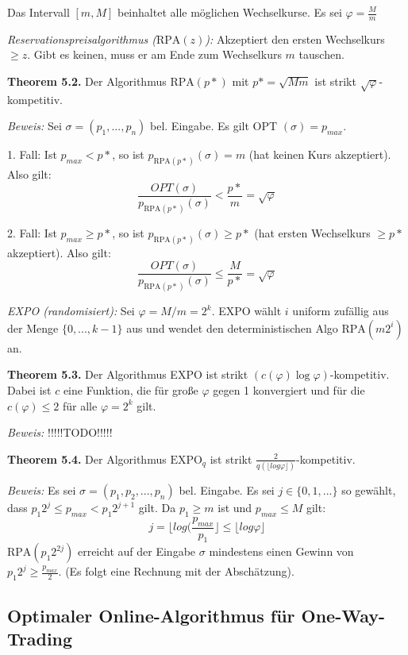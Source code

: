 Das Intervall $[m, M]$ beinhaltet alle möglichen Wechselkurse. Es sei $\varphi = \frac{M}{m}$

\textit{Reservationspreisalgorithmus ($\textrm{RPA}(z)$):} Akzeptiert den ersten Wechselkurs $\ge z$. Gibt es keinen, muss er am Ende zum Wechselkurs $m$ tauschen.

\textbf{Theorem 5.2.} Der Algorithmus $\textrm{RPA}(p*)$ mit $p* = \sqrt{Mm}$ ist strikt $\sqrt{\varphi}$-kompetitiv.

\textit{Beweis:} Sei $\sigma = (p_{1}, ..., p_{n})$ bel. Eingabe. Es gilt OPT $(\sigma) = p_{max}$.

1. Fall: Ist $p_{max} < p*$, so ist $p_{\textrm{RPA}(p*)}(\sigma) = m$ (hat keinen Kurs akzeptiert). Also gilt: $$\frac{OPT(\sigma)}{p_{\textrm{RPA}(p*)}(\sigma)} < \frac{p*}{m} = \sqrt{\varphi}$$

2. Fall: Ist $p_{max} \ge p*$, so ist $p_{\textrm{RPA}(p*)}(\sigma) \ge p*$ (hat ersten Wechselkurs $\ge p*$ akzeptiert). Also gilt: $$\frac{OPT(\sigma)}{p_{\textrm{RPA}(p*)}(\sigma)} \le \frac{M}{p*} = \sqrt{\varphi}$$

\textit{EXPO (randomisiert):} Sei $\varphi = M / m = 2^k$. EXPO wählt $i$ uniform zufällig aus der Menge $\{0, ..., k - 1\}$ aus und wendet den deterministischen Algo $\textrm{RPA}(m2^{i})$ an.

\textbf{Theorem 5.3.} Der Algorithmus EXPO ist strikt $(c(\varphi)\log\varphi)$-kompetitiv. Dabei ist $c$ eine Funktion, die für große $\varphi$ gegen 1 konvergiert und für die $c(\varphi) \le 2$ für alle $\varphi = 2^k$ gilt.

\textit{Beweis:} !!!!!TODO!!!!!

\textbf{Theorem 5.4.} Der Algorithmus $\textrm{EXPO}_{q}$ ist strikt $\frac{2}{q(\lfloor log\varphi \rfloor)}$-kompetitiv.

\textit{Beweis:} Es sei $\sigma = (p_{1}, p_{2}, ..., p_{n})$ bel. Eingabe. Es sei $j \in \{0, 1, ...\}$ so gewählt, dass $p_{1}2^{j} \le p_{max} < p_{1}2^{j+1}$ gilt. Da $p_{1} \ge m$ ist und $p_{max} \le M$ gilt:
$$j = \lfloor log(\frac{p_{max}}{p_{1}} \rfloor \le \lfloor log \varphi \rfloor$$
$\textrm{RPA}(p_{1}2^{2j})$ erreicht auf der Eingabe $\sigma$ mindestens einen Gewinn von $p_{1}2^{j} \ge \frac{p_{max}}{2}$. (Es folgt eine Rechnung mit der Abschätzung).

\subsection{Optimaler Online-Algorithmus für One-Way-Trading}


